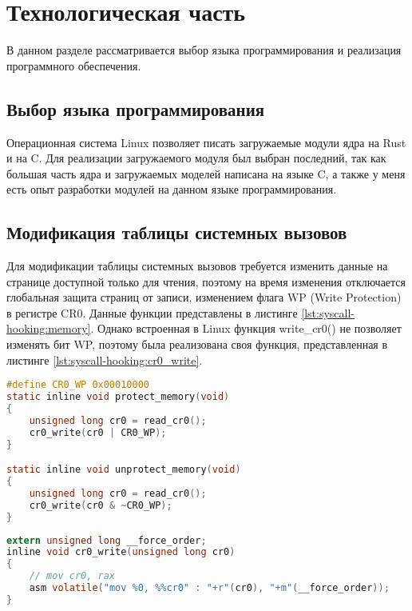 \chapter{Технологическая часть}
    В данном разделе рассматривается выбор языка программирования 
    и реализация программного обеспечения.

\section{Выбор языка программирования}
    Операционная система Linux позволяет писать загружаемые модули ядра на Rust и на C.
    Для реализации загружаемого модуля был выбран последний, так как
    большая часть ядра и загружаемых моделей написана на языке C, 
    а также у меня есть опыт разработки модулей на данном языке программирования.

\section{Модификация таблицы системных вызовов}
    Для модификации таблицы системных вызовов 
    требуется изменить данные на странице доступной только для чтения,
    поэтому на время изменения отключается глобальная защита страниц от записи,
    изменением флага WP (Write Protection) в регистре CR0.
    Данные функции представлены в листинге \ref{lst:syscall-hooking:memory}.
    Однако встроенная в Linux функция write\_cr0() не позволяет изменять бит WP, 
    поэтому была реализована своя функция, представленная в листинге \ref{lst:syscall-hooking:cr0_write}.

    \begin{lstlisting}[language=C, label=lst:syscall-hooking:memory, caption=Функции включение и отключение защиты от записи страницы]
#define CR0_WP 0x00010000
static inline void protect_memory(void)
{
    unsigned long cr0 = read_cr0();
    cr0_write(cr0 | CR0_WP);
}

static inline void unprotect_memory(void)
{
    unsigned long cr0 = read_cr0();
    cr0_write(cr0 & ~CR0_WP);
}
    \end{lstlisting}

    \begin{lstlisting}[language=C, label=lst:syscall-hooking:cr0_write, caption=Функция изменения значения регистра cr0]
extern unsigned long __force_order;
inline void cr0_write(unsigned long cr0)
{
    // mov cr0, rax
    asm volatile("mov %0, %%cr0" : "+r"(cr0), "+m"(__force_order));
}
    \end{lstlisting}

